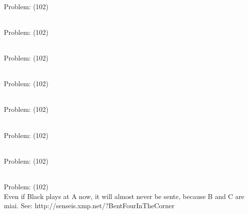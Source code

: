 \documentclass[11pt]{article}
\begin{document}
\begin{minipage}[t]{0.5\textwidth}
  {\centering
  
\\
Problem: (102)\\
  }
\end{minipage}
\begin{minipage}[t]{0.5\textwidth}
  {\centering
  
\\
Problem: (102)\\
  }
\end{minipage}
\begin{minipage}[t]{0.5\textwidth}
  {\centering
  
\\
Problem: (102)\\
  }
\end{minipage}
\begin{minipage}[t]{0.5\textwidth}
  {\centering
  
\\
Problem: (102)\\
  }
\end{minipage}
\begin{minipage}[t]{0.5\textwidth}
  {\centering
  
\\
Problem: (102)\\
  }
\end{minipage}
\begin{minipage}[t]{0.5\textwidth}
  {\centering
  
\\
Problem: (102)\\
  }
\end{minipage}
\begin{minipage}[t]{0.5\textwidth}
  {\centering
  
\\
Problem: (102)\\
  }
\end{minipage}
\begin{minipage}[t]{0.5\textwidth}
  {\centering
  
\\
Problem: (102)\\
Even if Black plays at A now, it will almost never be sente, because B and C are miai. See: http://senseis.xmp.net/?BentFourInTheCorner\\
  }
\end{minipage}
\end{document}
